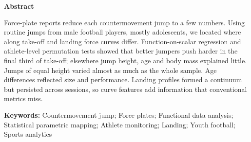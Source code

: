 \noindent\textbf{Abstract}\par\smallskip
\noindent Force-plate reports reduce each countermovement jump to a few numbers. Using \nTrials{} routine jumps from \nAth{} male football players, mostly adolescents, we located where along take-off and landing force curves differ. Function-on-scalar regression and athlete-level permutation tests showed that better jumpers push harder in the final third of take-off; elsewhere jump height, age and body mass explained little. Jumps of equal height varied almost as much as the whole sample. Age differences reflected size and performance. Landing profiles formed a continuum but persisted across sessions, so curve features add information that conventional metrics miss.

\medskip
\noindent\textbf{Keywords:} Countermovement jump; Force plates; Functional data analysis; Statistical parametric mapping; Athlete monitoring; Landing; Youth football; Sports analytics

